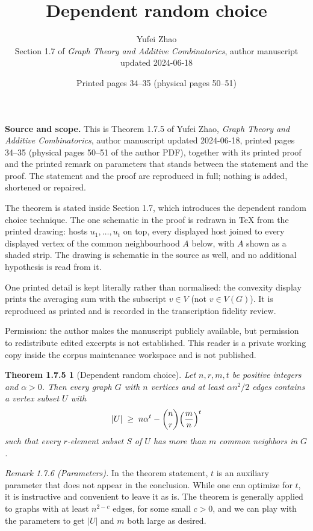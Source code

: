\documentclass[11pt]{article}
\title{Dependent random choice}
\author{Yufei Zhao\\[2pt]
\small Section 1.7 of \emph{Graph Theory and Additive Combinatorics},
author manuscript updated 2024-06-18}
\date{Printed pages 34--35 (physical pages 50--51)}
\newtheorem*{drc}{Theorem 1.7.5}
\begin{document}
\maketitle

\noindent\textbf{Source and scope.}
This is Theorem 1.7.5 of Yufei Zhao, \emph{Graph Theory and Additive
Combinatorics}, author manuscript updated 2024-06-18, printed pages 34--35
(physical pages 50--51 of the author PDF), together with its printed proof and
the printed remark on parameters that stands between the statement and the
proof. The statement and the proof are reproduced in full; nothing is added,
shortened or repaired.

The theorem is stated inside Section 1.7, which introduces the dependent random
choice technique. The one schematic in the proof is redrawn in \TeX{} from the
printed drawing: hosts $u_1,\dots,u_t$ on top, every displayed host joined to
every displayed vertex of the common neighbourhood $A$ below, with $A$ shown as
a shaded strip. The drawing is schematic in the source as well, and no
additional hypothesis is read from it.

One printed detail is kept literally rather than normalised: the convexity
display prints the averaging sum with the subscript $v\in V$ (not $v\in V(G)$).
It is reproduced as printed and is recorded in the transcription fidelity
review.

Permission: the author makes the manuscript publicly available, but permission
to redistribute edited excerpts is not established. This reader is a private
working copy inside the corpus maintenance workspace and is not published.


\begin{drc}[Dependent random choice]
Let $n,r,m,t$ be positive integers and $\alpha>0$. Then every graph $G$ with
$n$ vertices and at least $\alpha n^2/2$ edges contains a vertex subset $U$
with
\[
  |U| \;\ge\; n\alpha^{t}-\binom{n}{r}\Bigl(\frac{m}{n}\Bigr)^{t}
\]
such that every $r$-element subset $S$ of $U$ has more than $m$ common
neighbors in $G$.
\end{drc}

\noindent\emph{Remark 1.7.6 (Parameters).} In the theorem statement, $t$ is an
auxiliary parameter that does not appear in the conclusion. While one can
optimize for $t$, it is instructive and convenient to leave it as is. The
theorem is generally applied to graphs with at least $n^{2-c}$ edges, for some
small $c>0$, and we can play with the parameters to get $|U|$ and $m$ both
large as desired.
\end{document}
